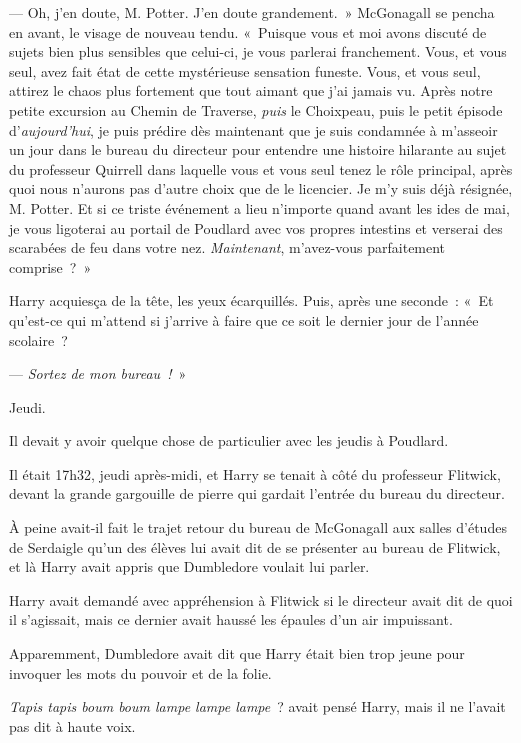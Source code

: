 --- Oh, j'en doute, M. Potter. J'en doute grandement.~»
McGonagall se pencha en avant, le visage de nouveau tendu.
«~Puisque vous et moi avons discuté de sujets bien plus sensibles que celui-ci, je vous parlerai franchement.
Vous, et vous seul, avez fait état de cette mystérieuse sensation funeste.
Vous, et vous seul, attirez le chaos plus fortement que tout aimant que j'ai jamais vu.
Après notre petite excursion au Chemin de Traverse, \emph{puis} le Choixpeau, puis le petit épisode d'\emph{aujourd'hui}, je puis prédire dès maintenant que je suis condamnée à m'asseoir un jour dans le bureau du directeur pour entendre une histoire hilarante au sujet du professeur Quirrell dans laquelle vous et vous seul tenez le rôle principal, après quoi nous n'aurons pas d'autre choix que de le licencier.
Je m'y suis déjà résignée, M. Potter.
Et si ce triste événement a lieu n'importe quand avant les ides de mai, je vous ligoterai au portail de Poudlard avec vos propres intestins et verserai des scarabées de feu dans votre nez.
\emph{Maintenant}, m'avez-vous parfaitement comprise~?~»

Harry acquiesça de la tête, les yeux écarquillés.
Puis, après une seconde~:
«~Et qu'est-ce qui m'attend si j'arrive à faire que ce soit le dernier jour de l'année scolaire~?

--- \emph{Sortez de mon bureau~!}~»

\later

Jeudi.

Il devait y avoir quelque chose de particulier avec les jeudis à Poudlard.

Il était 17h32, jeudi après-midi, et Harry se tenait à côté du professeur Flitwick, devant la grande gargouille de pierre qui gardait l'entrée du bureau du directeur.

À peine avait-il fait le trajet retour du bureau de McGonagall aux salles d'études de Serdaigle qu'un des élèves lui avait dit de se présenter au bureau de Flitwick, et là Harry avait appris que Dumbledore voulait lui parler.

Harry avait demandé avec appréhension à Flitwick si le directeur avait dit de quoi il s'agissait, mais ce dernier avait haussé les épaules d'un air impuissant.

Apparemment, Dumbledore avait dit que Harry était bien trop jeune pour invoquer les mots du pouvoir et de la folie.

\emph{Tapis tapis boum boum lampe lampe lampe}~? avait pensé Harry, mais il ne l'avait pas dit à haute voix.

